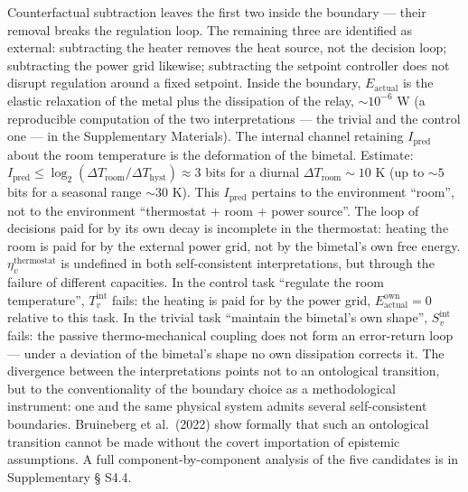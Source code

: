 \documentclass[pdflatex,sn-mathphys-ay]{sn-jnl}
\begin{document}
Counterfactual subtraction leaves the first two inside the boundary --- their removal breaks the regulation loop. The remaining three are identified as external: subtracting the heater removes the heat source, not the decision loop; subtracting the power grid likewise; subtracting the setpoint controller does not disrupt regulation around a fixed setpoint. Inside the boundary, \(E_{\text{actual}}\) is the elastic relaxation of the metal plus the dissipation of the relay, \(\sim 10^{-6}\) W (a reproducible computation of the two interpretations --- the trivial and the control one --- in the Supplementary Materials). The internal channel retaining \(I_{\text{pred}}\) about the room temperature is the deformation of the bimetal. Estimate: \(I_{\text{pred}} \le \log_2(\Delta T_{\text{room}}/\Delta T_{\text{hyst}}) \approx 3\) bits for a diurnal \(\Delta T_{\text{room}} \sim 10\) K (up to \(\sim 5\) bits for a seasonal range \(\sim 30\) K). This \(I_{\text{pred}}\) pertains to the environment ``room'', not to the environment ``thermostat + room + power source''. The loop of decisions paid for by its own decay is incomplete in the thermostat: heating the room is paid for by the external power grid, not by the bimetal's own free energy. \(\eta_v^{\text{thermostat}}\) is undefined in both self-consistent interpretations, but through the failure of different capacities. In the control task ``regulate the room temperature'', \(T_v^{\text{int}}\) fails: the heating is paid for by the power grid, \(E_{\text{actual}}^{\text{own}} = 0\) relative to this task. In the trivial task ``maintain the bimetal's own shape'', \(S_v^{\text{int}}\) fails: the passive thermo-mechanical coupling does not form an error-return loop --- under a deviation of the bimetal's shape no own dissipation corrects it. The divergence between the interpretations points not to an ontological transition, but to the conventionality of the boundary choice as a methodological instrument: one and the same physical system admits several self-consistent boundaries. Bruineberg et al.~(2022) show formally that such an ontological transition cannot be made without the covert importation of epistemic assumptions. A full component-by-component analysis of the five candidates is in Supplementary § S4.4.
\end{document}
